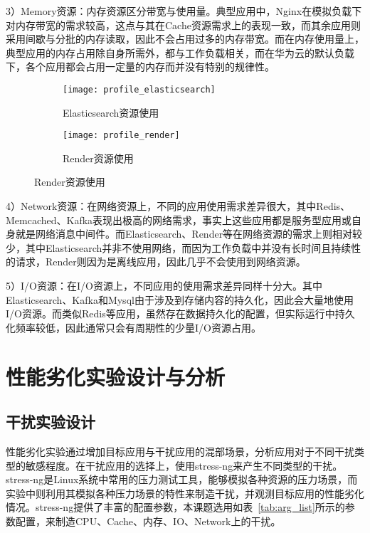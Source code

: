 3）Memory资源：内存资源区分带宽与使用量。典型应用中，Nginx在模拟负载下对内存带宽的需求较高，这点与其在Cache资源需求上的表现一致，而其余应用则采用间歇与分批的内存读取，因此不会占用过多的内存带宽。而在内存使用量上，典型应用的内存占用除自身所需外，都与工作负载相关，而在华为云的默认负载下，各个应用都会占用一定量的内存而并没有特别的规律性。

\begin{figure}[H]
    \centering
    \begin{subfigure}[b]{0.9\textwidth}
      \texttt{[image: profile\_elasticsearch]}
      \caption{Elasticsearch资源使用}
      \label{fig:profile_elasticsearch}
    \end{subfigure}
    \begin{subfigure}[b]{0.9\textwidth}
        \texttt{[image: profile\_render]}
        \caption{Render资源使用}
        \label{fig:profile_render}
    \end{subfigure}
\label{fig:resource_affinity_2}
\end{figure}

4）Network资源：在网络资源上，不同的应用使用需求差异很大，其中Redis、Memcached、Kafka表现出极高的网络需求，事实上这些应用都是服务型应用或自身就是网络消息中间件。而Elasticsearch、Render等在网络资源的需求上则相对较少，其中Elasticsearch并非不使用网络，而因为工作负载中并没有长时间且持续性的请求，Render则因为是离线应用，因此几乎不会使用到网络资源。

5）I/O资源：在I/O资源上，不同应用的使用需求差异同样十分大。其中Elasticsearch、Kafka和Mysql由于涉及到存储内容的持久化，因此会大量地使用I/O资源。而类似Redis等应用，虽然存在数据持久化的配置，但实际运行中持久化频率较低，因此通常只会有周期性的少量I/O资源占用。

\section{性能劣化实验设计与分析}

\subsection{干扰实验设计}


性能劣化实验通过增加目标应用与干扰应用的混部场景，分析应用对于不同干扰类型的敏感程度。在干扰应用的选择上，使用stress-ng来产生不同类型的干扰。stress-ng是Linux系统中常用的压力测试工具，能够模拟各种资源的压力场景，而实验中则利用其模拟各种压力场景的特性来制造干扰，并观测目标应用的性能劣化情况。stress-ng提供了丰富的配置参数，本课题选用如表~\ref{tab:arg_list}所示的参数配置，来制造CPU、Cache、内存、IO、Network上的干扰。

